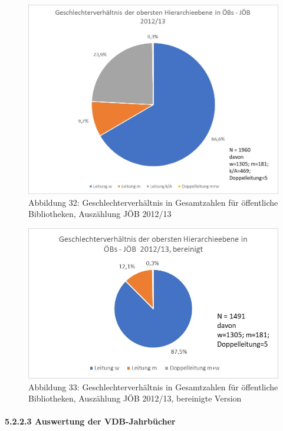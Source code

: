 \documentclass[a4paper,
fontsize=11pt,
oneside,
numbers=noperiodatend,
parskip=half-,
bibliography=totoc,
final
]{scrartcl}
\begin{document}
\begin{figure}
\centering
\includegraphics{img/Abb_32_JOB-2012_gesamt.jpg}
\caption{Abbildung 32: Geschlechterverhältnis in Gesamtzahlen für
öffentliche Bibliotheken, Auszählung JÖB 2012/13}
\end{figure}

\begin{figure}
\centering
\includegraphics{img/Abb_33_JOB-2012_gesamt_bereinigt.jpg}
\caption{Abbildung 33: Geschlechterverhältnis in Gesamtzahlen für
öffentliche Bibliotheken, Auszählung JÖB 2012/13, bereinigte Version}
\end{figure}

\paragraph{5.2.2.3 Auswertung der VDB-Jahrbücher}
\end{document}
